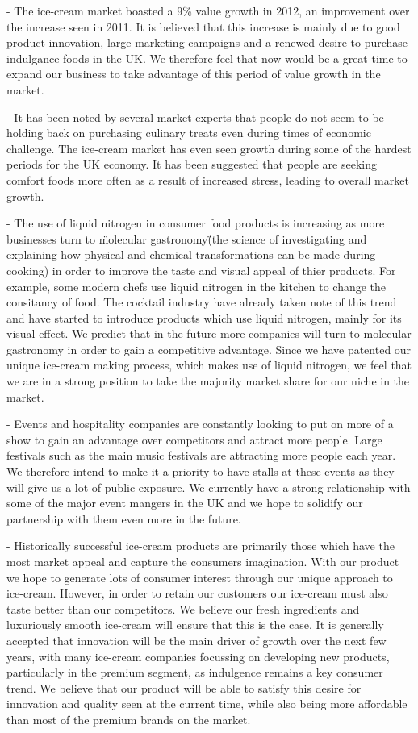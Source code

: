 \documentclass{article}
\begin{document}
   - The ice-cream market boasted a 9\% value growth in 2012, an improvement over the increase seen in 2011. It is believed that this increase is mainly due to good product innovation, large marketing campaigns and a renewed desire to purchase indulgance foods in the UK. We therefore feel that now would be a great time to expand our business to take advantage of this period of value growth in the market.

   - It has been noted by several market experts that people do not seem to be holding back on purchasing culinary treats even during times of economic challenge. The ice-cream market has even seen growth during some of the hardest periods for the UK economy. It has been suggested that people are seeking comfort foods more often as a result of increased stress, leading to overall market growth.

 - The use of liquid nitrogen in consumer food products is increasing as more businesses turn to \"molecular gastronomy\" (the science of investigating and explaining how physical and chemical transformations can be made during cooking) in order to improve the taste and visual appeal of thier products. For example, some modern chefs use liquid nitrogen in the kitchen to change the consitancy of food. The cocktail industry have already taken note of this trend and have started to introduce products which use liquid nitrogen, mainly for its visual effect. We predict that in the future more companies will turn to molecular gastronomy in order to gain a competitive advantage. Since we have patented our unique ice-cream making process, which makes use of liquid nitrogen, we feel that we are in a strong position to take the majority market share for our niche in the market. 

 - Events and hospitality companies are constantly looking to put on more of a show to gain an advantage over competitors and attract more people. Large festivals such as the main music festivals are attracting more people each year. We therefore intend to make it a priority to have stalls at these events as they will give us a lot of public exposure. We currently have a strong relationship with some of the major event mangers in the UK and we hope to solidify our partnership with them even more in the future.

 - Historically successful ice-cream products are primarily those which have the most market appeal and capture the consumers imagination. With our product we hope to generate lots of consumer interest through our unique approach to ice-cream. However, in order to retain our customers our ice-cream must also taste
better than our competitors. We believe our fresh ingredients and luxuriously smooth ice-cream will ensure that this is the case. It is generally accepted that innovation will be the main driver of growth over the next few years, with many ice-cream companies focussing on developing new products, particularly in the premium segment, as indulgence remains a key consumer trend. We believe that our product will be able to satisfy this desire for innovation and quality seen at the current time, while also being more affordable than most of the premium brands on the market.
\end{document}

